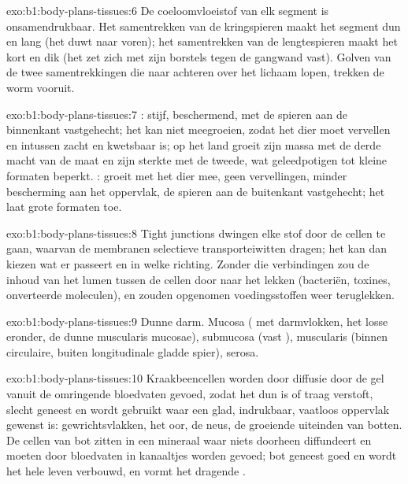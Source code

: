 \begin{solution}{exo:b1:body-plans-tissues:6}
De coeloomvloeistof van elk segment is onsamendrukbaar. Het samentrekken van de
kringspieren maakt het segment dun en lang (het duwt naar voren); het
samentrekken van de lengtespieren maakt het kort en dik (het zet zich met zijn
borstels tegen de gangwand vast). Golven van de twee samentrekkingen die naar
achteren over het lichaam lopen, trekken de worm vooruit.
\end{solution}

\begin{solution}{exo:b1:body-plans-tissues:7}
: stijf, beschermend, met de spieren aan de binnenkant vastgehecht; het
kan niet meegroeien, zodat het dier moet vervellen en intussen zacht en kwetsbaar
is; op het land groeit zijn massa met de derde macht van de maat en zijn sterkte
met de tweede, wat geleedpotigen tot kleine formaten beperkt. : groeit
met het dier mee, geen vervellingen, minder bescherming aan het oppervlak, de
spieren aan de buitenkant vastgehecht; het laat grote formaten toe.
\end{solution}

\begin{solution}{exo:b1:body-plans-tissues:8}
Tight junctions dwingen elke stof door de cellen te gaan, waarvan de membranen
selectieve transporteiwitten dragen; het  kan dan kiezen wat er passeert
en in welke richting. Zonder die verbindingen zou de inhoud van het lumen tussen
de cellen door naar het  lekken (bacteriën, toxines, onverteerde
moleculen), en zouden opgenomen voedingsstoffen weer teruglekken.
\end{solution}

\begin{solution}{exo:b1:body-plans-tissues:9}
Dunne darm. Mucosa ( met darmvlokken, het losse  eronder, de
dunne muscularis mucosae), submucosa (vast ), muscularis (binnen
circulaire, buiten longitudinale gladde spier), serosa.
\end{solution}

\begin{solution}{exo:b1:body-plans-tissues:10}
Kraakbeencellen worden door diffusie door de gel vanuit de omringende bloedvaten
gevoed, zodat het  dun is of traag verstoft, slecht geneest en wordt
gebruikt waar een glad, indrukbaar, vaatloos oppervlak gewenst is:
gewrichtsvlakken, het oor, de neus, de groeiende uiteinden van botten. De cellen
van bot zitten in een mineraal waar niets doorheen diffundeert en moeten door
bloedvaten in kanaaltjes worden gevoed; bot geneest goed en wordt het hele leven
verbouwd, en vormt het dragende .
\end{solution}

